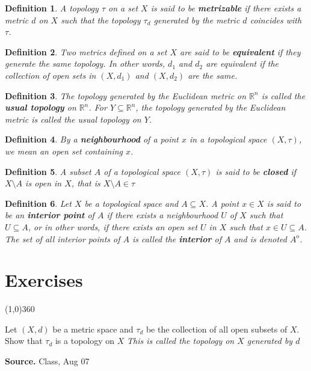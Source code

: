 \documentclass[12pt,twoside]{report}
\newtheorem{defn}{Definition}
\newenvironment*{source}{\hfill\scriptsize\textbf{Source.}\space}{\par}
\begin{document}
\begin{defn}
A topology $\tau$ on a set $X$ is said to be \textbf{metrizable} if there exists a metric $d$ on $X$ such that the topology $\tau_d$ generated by the metric $d$ coincides with $\tau$.
\end{defn}

\begin{defn}
Two metrics defined on a set $X$ are said to be \textbf{equivalent} if they generate the same topology. 
In other words, $d_1$ and $d_2$ are equivalent if the collection of open sets in $\left (X, d_1\right )$ and $\left (X, d_2\right )$ are the same.
\end{defn}

\begin{defn}
The topology generated by the Euclidean metric on $\mathbb{R} ^n$ is called the \textbf{usual topology} on $\mathbb{R} ^n$.
For $Y \subseteq \mathbb{R} ^n$, the topology generated by the Euclidean metric is called the usual topology on $Y$.
\end{defn}

\begin{defn}
By a \textbf{neighbourhood} of a point $x$ in a topological space $\left (X, \tau\right )$, we mean an open set containing $x$.
\end{defn}

\begin{defn}
A subset $A$ of a topological space $\left (X, \tau\right )$ is said to be \textbf{closed} if $X \setminus A$ is open in $X$, that is $X \setminus A \in \tau$
\end{defn}

\begin{defn}
Let $X$ be a topological space and $A \subseteq X$. A point $x \in X$ is said to be an \textbf{interior point} of $A$ if there exists a neighbourhood $U$ of $X$ such that $U \subseteq A$, or in other words, if there exists an open set $U$ in $X$ such that $x \in U \subseteq A$. The set of all interior points of $A$ is called the \textbf{interior} of $A$ and is denoted $A^\mathrm{o}$.
\end{defn}

\chapter{Exercises}
\line(1,0){360}

\begin{samepage}
\begin{ex}
Let $\left (X, d\right )$ be a metric space and $\tau_d$ be the collection of all open subsets of $X$. 
Show that $\tau_d$ is a topology on $X$
\vspace{0.5cm}
\textit{This is called the topology on $X$ generated by $d$}
\end{ex}
\begin{source}
Class, Aug 07
\end{source}
\end{samepage}
\end{document}
